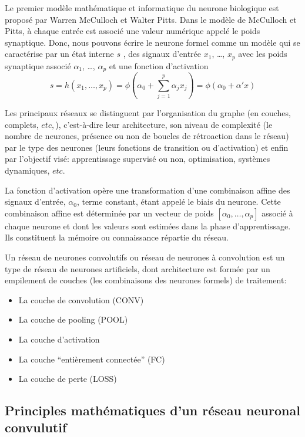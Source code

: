 \documentclass[
  11pt,
  dvipsnames]{article}
\providecommand{\tightlist}{%
  \setlength{\itemsep}{0pt}\setlength{\parskip}{0pt}}
\begin{document}
Le premier modèle mathématique et informatique du neurone biologique est proposé par Warren McCulloch et Walter Pitts. Dans le modèle de McCulloch et Pitts, à chaque entrée est associé une valeur numérique appelé le poids synaptique.
Donc, nous pouvons écrire le neurone formel comme un modèle qui se caractérise par
un état interne \(s\) , des signaux d'entrée \(x_{1}\), \dots, \(x_{p}\) avec les poids synaptique associé
\(\alpha_{1}\), \dots, \(\alpha_{p}\) et une fonction d'activation
\[ s=h(x_{1},\dots,x_{p})=\phi(\alpha_{0} + \sum_{j=1}^{p} \alpha_{j}x_{j}) = \phi(\alpha_{0} + \alpha' x)\]

Les principaux réseaux se distinguent par l'organisation du graphe (en couches, complets, \(etc,\)), c'est-à-dire leur architecture, son niveau de complexité (le nombre de neurones, présence ou non de boucles de rétroaction dans le réseau) par le type des neurones (leurs fonctions de transition ou d'activation) et enfin par l'objectif visé: apprentissage supervisé ou non, optimisation, systèmes dynamiques, \(etc.\)

La fonction d'activation opère une transformation d'une combinaison affine
des signaux d'entrée, \(\alpha_{0}\), terme constant, étant appelé le biais du neurone.
Cette combinaison affine est déterminée par un vecteur de poids \([\alpha_{0},\dots,\alpha_{p}]\) associé à chaque neurone et dont les valeurs sont estimées dans la phase d'apprentissage.
Ils constituent la mémoire ou connaissance répartie du réseau.

Un réseau de neurones convolutifs ou réseau de neurones à convolution
est un type de réseau de neurones artificiels, dont architecture est formée par
un empilement de couches (les combinaisons des neurones formels) de traitement:

\begin{itemize}
\tightlist
\item
  La couche de convolution (CONV)
\item
  La couche de pooling (POOL)
\item
  La couche d'activation
\item
  La couche ``entièrement connectée'' (FC)
\item
  La couche de perte (LOSS)
\end{itemize}

\hypertarget{principles-mathuxe9matiques-dun-ruxe9seau-neuronal-convulutif}{%
\subsection{Principles mathématiques d'un réseau neuronal convulutif}\label{principles-mathuxe9matiques-dun-ruxe9seau-neuronal-convulutif}}
\end{document}
